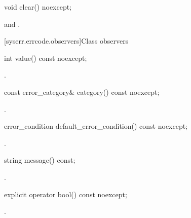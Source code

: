 %
\begin{itemdecl}
void clear() noexcept;
\end{itemdecl}

\begin{itemdescr}
\pnum
\postconditions {} and .
\end{itemdescr}


[syserr.errcode.observers]{Class  observers}

%
\begin{itemdecl}
int value() const noexcept;
\end{itemdecl}

\begin{itemdescr}
\pnum
\returns {}.
\end{itemdescr}

%
\begin{itemdecl}
const error_category& category() const noexcept;
\end{itemdecl}

\begin{itemdescr}
\pnum
\returns {}.
\end{itemdescr}

%
\begin{itemdecl}
error_condition default_error_condition() const noexcept;
\end{itemdecl}

\begin{itemdescr}
\pnum
\returns {}.
\end{itemdescr}

%
\begin{itemdecl}
string message() const;
\end{itemdecl}

\begin{itemdescr}
\pnum
\returns {}.
\end{itemdescr}

%
\begin{itemdecl}
explicit operator bool() const noexcept;
\end{itemdecl}

\begin{itemdescr}
\pnum
\returns {}.
\end{itemdescr}

